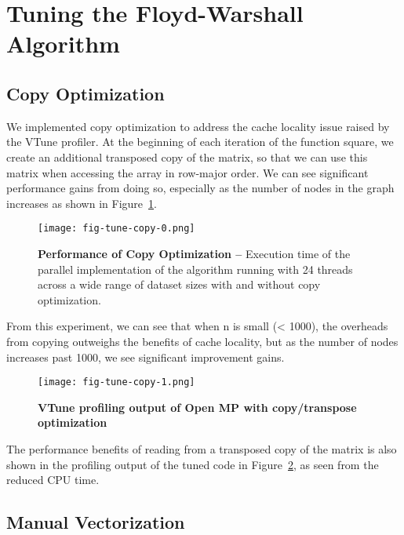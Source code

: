 
\section{Tuning the Floyd-Warshall Algorithm}
\label{sec-tune}

\subsection{Copy Optimization}
\label{sec-tune-copy}

We implemented copy optimization to address the cache locality issue
raised by the VTune profiler. At the beginning of each iteration of the
function square, we create an additional transposed copy of the matrix,
so that we can use this matrix when accessing the array in row-major
order. We can see significant performance gains from doing so, especially
as the number of nodes in the graph increases as shown in
Figure~\ref{fig-tune-copy-0}.

\begin{figure}[h]
  \centering
  \texttt{[image: fig-tune-copy-0.png]}
  \caption{\textbf{Performance of Copy Optimization --} Execution time of
    the parallel implementation of the algorithm running with 24 threads
    across a wide range of dataset sizes with and without copy
    optimization.}
  \label{fig-tune-copy-0}
\end{figure}

From this experiment, we can see that when n is small (< 1000), the
overheads from copying outweighs the benefits of cache locality, but as
the number of nodes increases past 1000, we see significant improvement
gains.

\begin{figure}[h]
  \centering
  \texttt{[image: fig-tune-copy-1.png]}
  \caption{\textbf{VTune profiling output of Open MP with copy/transpose
      optimization}}
  \label{fig-tune-copy-1}
\end{figure}

The performance benefits of reading from a transposed copy of the matrix
is also shown in the profiling output of the tuned code in
Figure~\ref{fig-tune-copy-1}, as seen from the reduced CPU time.

\subsection{Manual Vectorization}
\label{sec-tune-vector}

